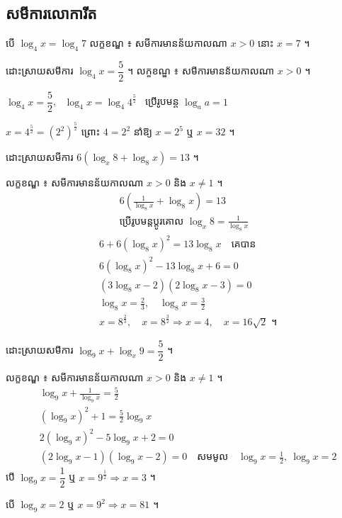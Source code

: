 \subsection{សមីការលោការីត}

\begin{example}[ឧទាហរណ៍ ១]
បើ $\log_4 x = \log_4 7$ លក្ខខណ្ឌ ៖ សមីការមានន័យកាលណា $x > 0$ នោះ $x = 7$ ។
\end{example}

\begin{example}[ឧទាហរណ៍ ២]
ដោះស្រាយសមីការ $\log_4 x = \dfrac{5}{2}$ ។ លក្ខខណ្ឌ ៖ សមីការមានន័យកាលណា $x > 0$ ។

$\log_4 x = \dfrac{5}{2}$, \ $\log_4 x = \log_4 4^{\frac{5}{2}}$ \ ប្រើរូបមន្ត $\log_a a = 1$

$x = 4^{\frac{5}{2}} = (2^2)^{\frac{5}{2}}$ ព្រោះ $4 = 2^2$ នាំឱ្យ $x = 2^5$ ឬ $x = 32$ ។
\end{example}

\begin{example}[ឧទាហរណ៍ ៣]
ដោះស្រាយសមីការ $6(\log_x 8 + \log_8 x) = 13$ ។

លក្ខខណ្ឌ ៖ សមីការមានន័យកាលណា $x > 0$ និង $x \ne 1$ ។
\[
\begin{gathered}
6\left(\frac{1}{\log_8 x} + \log_8 x\right) = 13\\
\text{ប្រើរូបមន្តប្តូរគោល } \log_x 8 = \frac{1}{\log_8 x}
\end{gathered}
\]
\[
\begin{aligned}
&6 + 6(\log_8 x)^2 = 13\log_8 x \quad \text{គេបាន}\\
&6(\log_8 x)^2 - 13\log_8 x + 6 = 0\\
&(3\log_8 x - 2)(2\log_8 x - 3) = 0\\
&\log_8 x = \frac{2}{3}, \quad \log_8 x = \frac{3}{2}\\
&x = 8^{\frac{2}{3}}, \quad x = 8^{\frac{3}{2}} \Rightarrow x = 4, \quad x = 16\sqrt{2} \text{ ។}
\end{aligned}
\]
\end{example}

\begin{example}[ឧទាហរណ៍ ៤]
ដោះស្រាយសមីការ $\log_9 x + \log_x 9 = \dfrac{5}{2}$ ។

លក្ខខណ្ឌ ៖ សមីការមានន័យកាលណា $x > 0$ និង $x \ne 1$ ។
\[
\begin{aligned}
&\log_9 x + \frac{1}{\log_9 x} = \frac{5}{2}\\
&(\log_9 x)^2 + 1 = \frac{5}{2}\log_9 x\\
&2(\log_9 x)^2 - 5\log_9 x + 2 = 0\\
&(2\log_9 x - 1)(\log_9 x - 2) = 0 \quad \text{សមមូល} \quad \log_9 x = \frac{1}{2}, \ \log_9 x = 2
\end{aligned}
\]
បើ $\log_9 x = \dfrac{1}{2}$ ឬ $x = 9^{\frac{1}{2}} \Rightarrow x = 3$ ។

បើ $\log_9 x = 2$ ឬ $x = 9^2 \Rightarrow x = 81$ ។
\end{example}

